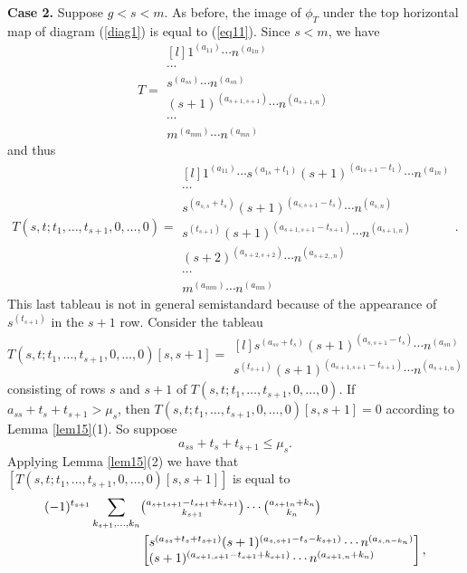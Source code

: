 \documentclass[ALCO,Unicode]{cedram}
\numberwithin{equation}{section}
\begin{document}
\textbf{Case 2.} Suppose $g<s<m.$ As before, the image of $\phi_T$ under the top horizontal map of diagram (\ref{diag1}) is equal to (\ref{eq11}). Since $s<m$, we have \begin{equation}T= \begin{matrix*}[l]
		1^{(a_{11})} \cdots n^{(a_{1n})} \\
		\cdots \\ 
		s^{(a_{ss})} \cdots n^{(a_{sn})} \\
		(s+1)^{(a_{s+1,s+1})} \cdots n^{(a_{s+1,n})}\\
		\cdots\\
		m^{(a_{mm})} \cdots n^{(a_{mn})}  \end{matrix*}\end{equation}
and thus 
\begin{equation*}\label{case21}T(s,t;t_1,\dots,t_{s+1},0,\dots,0)= \begin{matrix*}[l]
		1^{(a_{11})} \cdots s^{(a_{1s}+t_1)}(s+1)^{(a_{1s+1}-t_1)} \cdots n^{(a_{1n})} \\
		\cdots \\ 
		s^{(a_{s,s}+t_s)}(s+1)^{(a_{s,s+1}-t_s)} \cdots n^{(a_{s,n})} \\
		s^{(t_{s+1})}(s+1)^{(a_{s+1,s+1}-t_{s+1})} \cdots n^{(a_{s+1,n})}\\
		(s+2)^{(a_{s+2,s+2})}\cdots n^{(a_{s+2,,n})} \\
		\cdots\\
		m^{(a_{mm})} \cdots n^{(a_{mn})}  \end{matrix*}.\end{equation*}
	This last tableau is not in general semistandard because of the appearance of $s^{(t_{s+1})}$ in the $s+1$ row. Consider the tableau \begin{equation}\label{eq117}T(s,t;t_1,\dots,t_{s+1},0,\dots,0)[s,s+1]=\begin{matrix*}[l] 
			s^{(a_{ss}+t_s)}(s+1)^{(a_{s,s+1}-t_s)} \cdots n^{(a_{sn})} \\
			s^{(t_{s+1})}(s+1)^{(a_{s+1,s+1}-t_{s+1})} \cdots n^{(a_{s+1,n})} \end{matrix*} \end{equation} consisting of rows $s$ and $s+1$ of $T(s,t;t_1,\dots,t_{s+1},0,\dots,0)$. If $a_{ss}+t_s+t_{s+1} > \mu_s$, then $T(s,t;t_1,\dots,t_{s+1},0,\dots,0)[s,s+1]=0$ according to Lemma \ref{lem15}(1). So suppose \begin{equation}\label{case2n1}a_{ss}+t_s+t_{s+1} \le \mu_s.\end{equation} Applying Lemma \ref{lem15}(2) we have that $[T(s,t;t_1,\dots,t_{s+1},0,\dots,0)[s,s+1]]$ is equal to \begin{align*}
		(-1)^{t_{s+1}}\sum_{k_{s+1},\dots,k_n}&\tbinom{a_{s+1s+1}-t_{s+1}+k_{s+1}}{k_{s+1}}\cdots\tbinom{a_{s+1n}+k_n}{k_n}\\
		&\begin{bmatrix*}[l] 
			s^{(a_{ss}+t_s+t_{s+1})}(s+1)^{(a_{s,s+1}-t_s-k_{s+1})} \cdots n^{(a_{s,n-k_n})} \\
			(s+1)^{(a_{s+1,s+1}-t_{s+1}+k_{s+1})} \cdots n^{(a_{s+1,n}+k_n)} \end{bmatrix*},
	\end{align*} 
\end{document}
